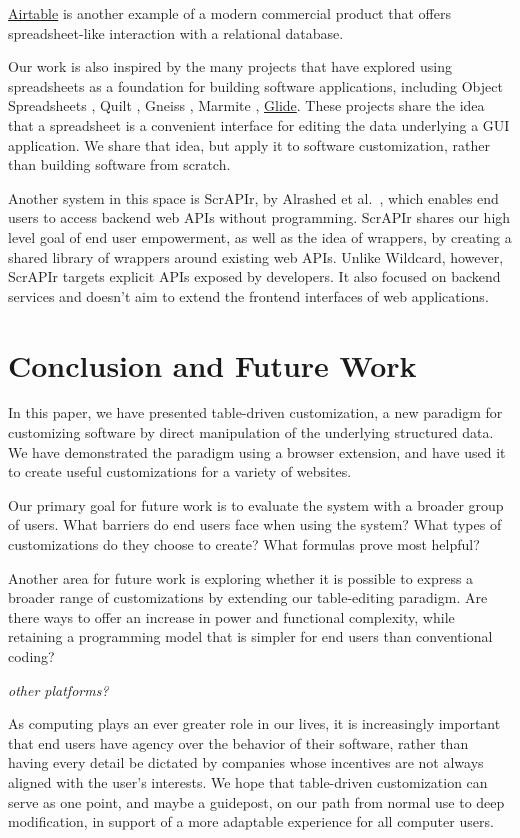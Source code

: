 \documentclass[sigplan,screen,10pt,anonymous,review]{acmart}
\begin{document}
\href{https://airtable.com/}{Airtable} is another example of a modern
commercial product that offers spreadsheet-like interaction with a
relational database.

Our work is also inspired by the many projects that have explored using
spreadsheets as a foundation for building software applications,
including Object Spreadsheets \citep{mccutchen2016}, Quilt
\citep{benson2014}, Gneiss \citep{chang2014}, Marmite \citep{wong2007},
\href{https://www.glideapps.com/}{Glide}. These projects share the idea
that a spreadsheet is a convenient interface for editing the data
underlying a GUI application. We share that idea, but apply it to
software customization, rather than building software from scratch.

Another system in this space is ScrAPIr, by Alrashed et
al.~\citep{alrashed2020}, which enables end users to access backend web
APIs without programming. ScrAPIr shares our high level goal of end user
empowerment, as well as the idea of wrappers, by creating a shared
library of wrappers around existing web APIs. Unlike Wildcard, however,
ScrAPIr targets explicit APIs exposed by developers. It also focused on
backend services and doesn't aim to extend the frontend interfaces of
web applications.

\hypertarget{sec:conclusion}{%
\section{Conclusion and Future Work}\label{sec:conclusion}}

In this paper, we have presented table-driven customization, a new
paradigm for customizing software by direct manipulation of the
underlying structured data. We have demonstrated the paradigm using a
browser extension, and have used it to create useful customizations for
a variety of websites.

Our primary goal for future work is to evaluate the system with a
broader group of users. What barriers do end users face when using the
system? What types of customizations do they choose to create? What
formulas prove most helpful?

Another area for future work is exploring whether it is possible to
express a broader range of customizations by extending our table-editing
paradigm. Are there ways to offer an increase in power and functional
complexity, while retaining a programming model that is simpler for end
users than conventional coding?

\emph{other platforms?}

As computing plays an ever greater role in our lives, it is increasingly
important that end users have agency over the behavior of their
software, rather than having every detail be dictated by companies whose
incentives are not always aligned with the user's interests. We hope
that table-driven customization can serve as one point, and maybe a
guidepost, on our path from normal use to deep modification, in support
of a more adaptable experience for all computer users.



\end{document}
